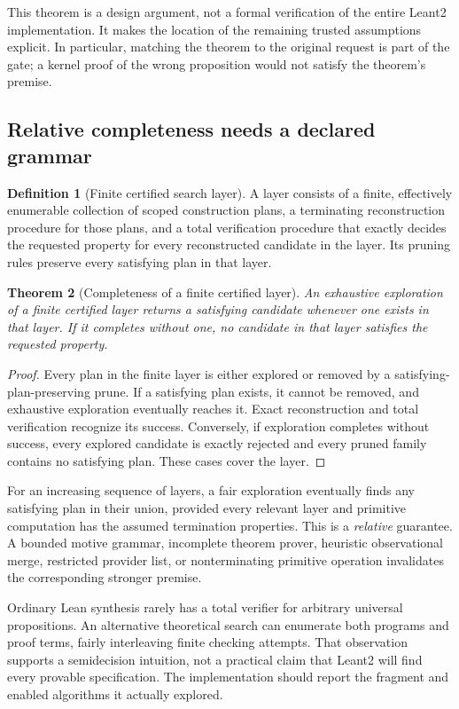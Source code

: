 \documentclass[11pt,letterpaper]{article}
\newtheorem{theorem}{Theorem}[section]
\theoremstyle{definition}
\newtheorem{definition}[theorem]{Definition}
\theoremstyle{remark}
\begin{document}
This theorem is a design argument, not a formal verification of the entire Leant2 implementation. It makes the location of the remaining trusted assumptions explicit. In particular, matching the theorem to the original request is part of the gate; a kernel proof of the wrong proposition would not satisfy the theorem's premise.

\subsection{Relative completeness needs a declared grammar}

\begin{definition}[Finite certified search layer]
A layer consists of a finite, effectively enumerable collection of scoped construction plans, a terminating reconstruction procedure for those plans, and a total verification procedure that exactly decides the requested property for every reconstructed candidate in the layer. Its pruning rules preserve every satisfying plan in that layer.
\end{definition}

\begin{theorem}[Completeness of a finite certified layer]
An exhaustive exploration of a finite certified layer returns a satisfying candidate whenever one exists in that layer. If it completes without one, no candidate in that layer satisfies the requested property.
\end{theorem}
\begin{proof}
Every plan in the finite layer is either explored or removed by a satisfying-plan-preserving prune. If a satisfying plan exists, it cannot be removed, and exhaustive exploration eventually reaches it. Exact reconstruction and total verification recognize its success. Conversely, if exploration completes without success, every explored candidate is exactly rejected and every pruned family contains no satisfying plan. These cases cover the layer.
\end{proof}

For an increasing sequence of layers, a fair exploration eventually finds any satisfying plan in their union, provided every relevant layer and primitive computation has the assumed termination properties. This is a \emph{relative} guarantee. A bounded motive grammar, incomplete theorem prover, heuristic observational merge, restricted provider list, or nonterminating primitive operation invalidates the corresponding stronger premise.

Ordinary Lean synthesis rarely has a total verifier for arbitrary universal propositions. An alternative theoretical search can enumerate both programs and proof terms, fairly interleaving finite checking attempts. That observation supports a semidecision intuition, not a practical claim that Leant2 will find every provable specification. The implementation should report the fragment and enabled algorithms it actually explored.
\end{document}
